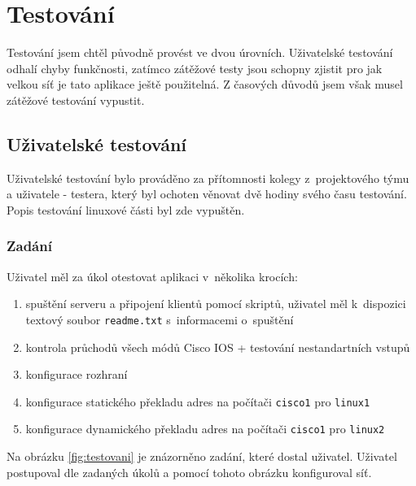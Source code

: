 \chapter{Testování}


Testování jsem chtěl původně provést ve dvou úrovních. Uživatelské testování odhalí chyby funkčnosti, zatímco zátěžové testy jsou schopny zjistit pro jak velkou síť je tato aplikace ještě použitelná. Z časových důvodů jsem však musel zátěžové testování vypustit.

\section{Uživatelské testování}
Uživatelské testování bylo prováděno za přítomnosti kolegy z~projektového týmu a uživatele - testera, který byl ochoten věnovat dvě hodiny svého času testování. Popis testování linuxové části byl zde vypuštěn.

\subsection{Zadání}
Uživatel měl za úkol otestovat aplikaci v~několika krocích:
\begin{enumerate}
 \item spuštění serveru a připojení klientů pomocí skriptů, uživatel měl k~dispozici textový soubor \verb|readme.txt| s~informacemi o~spuštění
 \item kontrola průchodů všech módů Cisco IOS + testování nestandartních vstupů
 \item konfigurace rozhraní
 \item konfigurace statického překladu adres na počítači \verb|cisco1| pro \verb|linux1|
 \item konfigurace dynamického překladu adres na počítači \verb|cisco1| pro \verb|linux2|
\end{enumerate}

Na obrázku \ref{fig:testovani} je znázorněno zadání, které dostal uživatel. Uživatel postupoval dle zadaných úkolů a pomocí tohoto obrázku konfiguroval síť.

